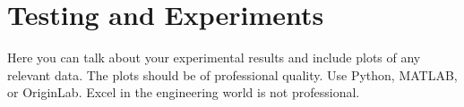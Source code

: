 \section{Testing and Experiments}
Here you can talk about your experimental results and include plots of any relevant data. The plots should be of professional quality. Use Python, MATLAB, or OriginLab. Excel in the engineering world is not professional. 

